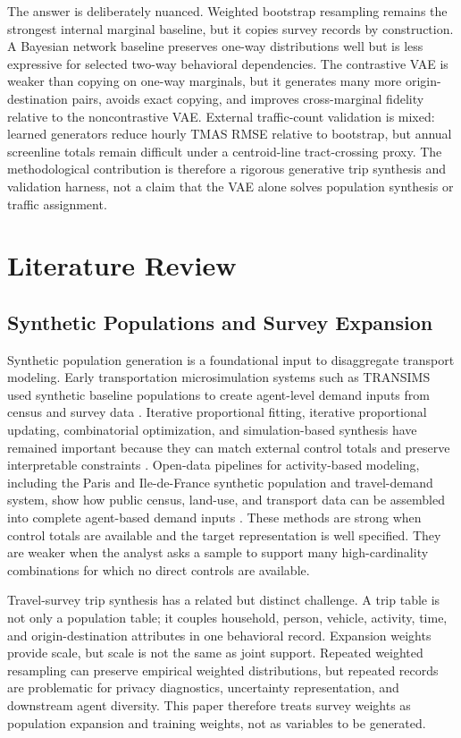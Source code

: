 \documentclass[3p,times,procedia]{elsarticle}
\begin{document}
The answer is deliberately nuanced. Weighted bootstrap resampling remains the strongest internal marginal baseline, but it copies survey records by construction. A Bayesian network baseline preserves one-way distributions well but is less expressive for selected two-way behavioral dependencies. The contrastive VAE is weaker than copying on one-way marginals, but it generates many more origin-destination pairs, avoids exact copying, and improves cross-marginal fidelity relative to the noncontrastive VAE. External traffic-count validation is mixed: learned generators reduce hourly TMAS RMSE relative to bootstrap, but annual screenline totals remain difficult under a centroid-line tract-crossing proxy. The methodological contribution is therefore a rigorous generative trip synthesis and validation harness, not a claim that the VAE alone solves population synthesis or traffic assignment.

\section{Literature Review}\label{sec:literature}
\subsection{Synthetic Populations and Survey Expansion}
Synthetic population generation is a foundational input to disaggregate transport modeling. Early transportation microsimulation systems such as TRANSIMS used synthetic baseline populations to create agent-level demand inputs from census and survey data \cite{beckman1996creating}. Iterative proportional fitting, iterative proportional updating, combinatorial optimization, and simulation-based synthesis have remained important because they can match external control totals and preserve interpretable constraints \cite{farooq2013simulation}. Open-data pipelines for activity-based modeling, including the Paris and Ile-de-France synthetic population and travel-demand system, show how public census, land-use, and transport data can be assembled into complete agent-based demand inputs \cite{horl2021synthetic}. These methods are strong when control totals are available and the target representation is well specified. They are weaker when the analyst asks a sample to support many high-cardinality combinations for which no direct controls are available.

Travel-survey trip synthesis has a related but distinct challenge. A trip table is not only a population table; it couples household, person, vehicle, activity, time, and origin-destination attributes in one behavioral record. Expansion weights provide scale, but scale is not the same as joint support. Repeated weighted resampling can preserve empirical weighted distributions, but repeated records are problematic for privacy diagnostics, uncertainty representation, and downstream agent diversity. This paper therefore treats survey weights as population expansion and training weights, not as variables to be generated.
\end{document}
